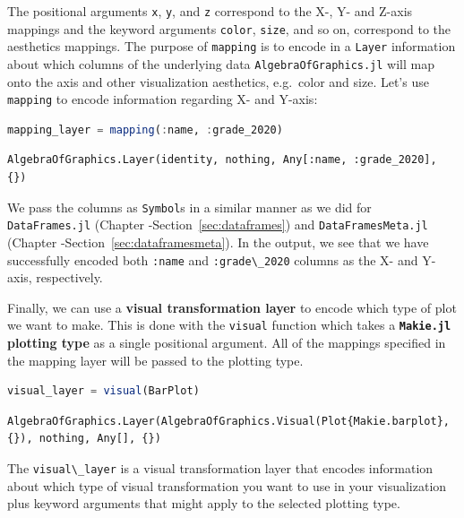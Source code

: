 \documentclass[
  notoc %
]{tufte-book}
\newcommand{\passthrough}[1]{#1}
\begin{document}
The positional arguments \passthrough{\lstinline!x!},
\passthrough{\lstinline!y!}, and \passthrough{\lstinline!z!} correspond
to the X-, Y- and Z-axis mappings and the keyword arguments
\passthrough{\lstinline!color!}, \passthrough{\lstinline!size!}, and so
on, correspond to the aesthetics mappings. The purpose of
\passthrough{\lstinline!mapping!} is to encode in a
\passthrough{\lstinline!Layer!} information about which columns of the
underlying data \passthrough{\lstinline!AlgebraOfGraphics.jl!} will map
onto the axis and other visualization aesthetics, e.g.~color and size.
Let's use \passthrough{\lstinline!mapping!} to encode information
regarding X- and Y-axis:

\begin{lstlisting}[language=Julia]
mapping_layer = mapping(:name, :grade_2020)
\end{lstlisting}

\begin{lstlisting}[language=Output]
AlgebraOfGraphics.Layer(identity, nothing, Any[:name, :grade_2020], {})
\end{lstlisting}

We pass the columns as \passthrough{\lstinline!Symbol!}s in a similar
manner as we did for \passthrough{\lstinline!DataFrames.jl!} (Chapter
-Section~\ref{sec:dataframes}) and
\passthrough{\lstinline!DataFramesMeta.jl!} (Chapter
-Section~\ref{sec:dataframesmeta}). In the output, we see that we have
successfully encoded both \passthrough{\lstinline!:name!} and
\passthrough{\lstinline!:grade\_2020!} columns as the X- and Y-axis,
respectively.

Finally, we can use a \textbf{visual transformation layer} to encode
which type of plot we want to make. This is done with the
\passthrough{\lstinline!visual!} function which takes a
\textbf{\passthrough{\lstinline!Makie.jl!} plotting type} as a single
positional argument. All of the mappings specified in the mapping layer
will be passed to the plotting type.

\begin{lstlisting}[language=Julia]
visual_layer = visual(BarPlot)
\end{lstlisting}

\begin{lstlisting}[language=Output]
AlgebraOfGraphics.Layer(AlgebraOfGraphics.Visual(Plot{Makie.barplot}, {}), nothing, Any[], {})
\end{lstlisting}

The \passthrough{\lstinline!visual\_layer!} is a visual transformation
layer that encodes information about which type of visual transformation
you want to use in your visualization plus keyword arguments that might
apply to the selected plotting type.
\end{document}
